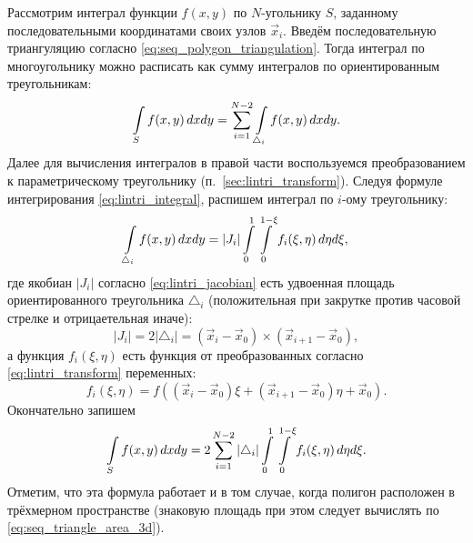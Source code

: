 \label{sec:polygon_integral} 
Рассмотрим интеграл функции $f(x,y)$ по $N$-угольнику $S$, заданному последовательными координатами своих узлов $\vec x_i$.
Введём последовательную триангуляцию согласно \cref{eq:seq_polygon_triangulation}.
Тогда интеграл по многоугольнику можно расписать как сумму интегралов по ориентированным треугольникам:
\begin{equation}
\label{eq:seq_triangulation_integral}
\arint{f(x,y)}{S}{xdy} = \sum_{i=1}^{N-2} \arint{f(x,y)}{\triangle_i}{xdy}.
\end{equation}
Далее для вычисления интегралов в правой части
воспользуемся преобразованием к параметрическому треугольнику (п.~\ref{sec:lintri_transform}).
Следуя формуле интегрирования \cref{eq:lintri_integral}, распишем
интеграл по $i$-ому треугольнику:
\begin{equation*}
\arint{f(x,y)}{\triangle_i}{xdy} = |J_i| \int\limits_{0}^{1}\int\limits_{0}^{1-\xi} f_i(\xi, \eta) \, d\eta d\xi,
\end{equation*}
где якобиан $|J_i|$ согласно \cref{eq:lintri_jacobian} есть удвоенная площадь ориентированного треугольника $\triangle_i$
(положительная при закрутке против часовой стрелке и отрицаетельная иначе):
\begin{equation*}
|J_i| = 2|\triangle_i| = (\vec x_i - \vec x_0) \times (\vec x_{i+1} - \vec x_0),
\end{equation*}
а функция $f_i(\xi, \eta)$ есть функция от преобразованных согласно \cref{eq:lintri_transform}
переменных:
\begin{equation*}
f_i(\xi, \eta) = f\left(\left(\vec x_i - \vec x_0\right)\xi + \left(\vec x_{i+1} - \vec x_0\right)\eta + \vec x_0\right).
\end{equation*}
Окончательно запишем
\begin{equation}
\label{eq:polygon_integral}
\arint{f(x,y)}{S}{xdy} = 2 \sum_{i=1}^{N-2}
    |\triangle_i| \int\limits_{0}^{1}\int\limits_{0}^{1-\xi} f_i(\xi, \eta) \, d\eta d\xi.
\end{equation}
Отметим, что эта формула работает и в том случае, когда
полигон расположен в трёхмерном пространстве
(знаковую площадь при этом следует вычислять по \cref{eq:seq_triangle_area_3d}).


